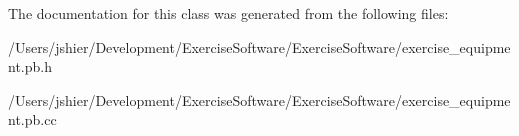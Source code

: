 The documentation for this class was generated from the following files\+:\begin{DoxyCompactItemize}
\item 
/\+Users/jshier/\+Development/\+Exercise\+Software/\+Exercise\+Software/exercise\+\_\+equipment.\+pb.\+h\item 
/\+Users/jshier/\+Development/\+Exercise\+Software/\+Exercise\+Software/exercise\+\_\+equipment.\+pb.\+cc\end{DoxyCompactItemize}
